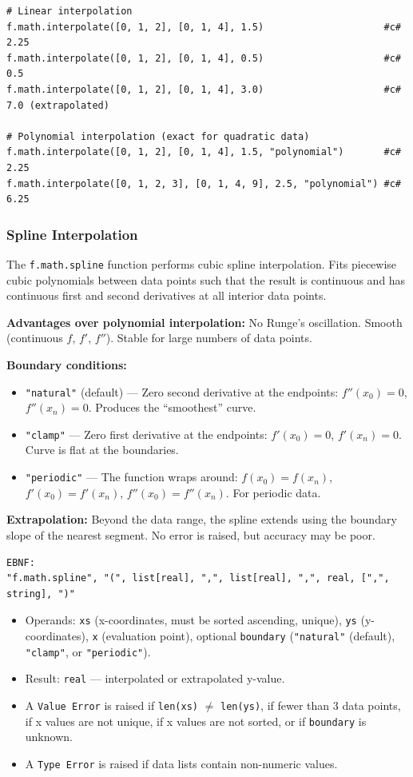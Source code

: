 \begin{verbatim}
# Linear interpolation
f.math.interpolate([0, 1, 2], [0, 1, 4], 1.5)                     #c# 2.25
f.math.interpolate([0, 1, 2], [0, 1, 4], 0.5)                     #c# 0.5
f.math.interpolate([0, 1, 2], [0, 1, 4], 3.0)                     #c# 7.0 (extrapolated)

# Polynomial interpolation (exact for quadratic data)
f.math.interpolate([0, 1, 2], [0, 1, 4], 1.5, "polynomial")       #c# 2.25
f.math.interpolate([0, 1, 2, 3], [0, 1, 4, 9], 2.5, "polynomial") #c# 6.25
\end{verbatim}

\subsubsection{Spline Interpolation}
The \texttt{f.math.spline} function performs cubic spline interpolation. Fits piecewise cubic polynomials between data points such that the result is continuous and has continuous first and second derivatives at all interior data points.

\textbf{Advantages over polynomial interpolation:} No Runge's oscillation. Smooth (continuous $f$, $f'$, $f''$). Stable for large numbers of data points.

\textbf{Boundary conditions:}
\begin{itemize}
\item \texttt{"natural"} (default) --- Zero second derivative at the endpoints: $f''(x_0) = 0$, $f''(x_n) = 0$. Produces the ``smoothest'' curve.
\item \texttt{"clamp"} --- Zero first derivative at the endpoints: $f'(x_0) = 0$, $f'(x_n) = 0$. Curve is flat at the boundaries.
\item \texttt{"periodic"} --- The function wraps around: $f(x_0) = f(x_n)$, $f'(x_0) = f'(x_n)$, $f''(x_0) = f''(x_n)$. For periodic data.
\end{itemize}

\textbf{Extrapolation:} Beyond the data range, the spline extends using the boundary slope of the nearest segment. No error is raised, but accuracy may be poor.

\begin{verbatim}
EBNF:
"f.math.spline", "(", list[real], ",", list[real], ",", real, [",", string], ")"
\end{verbatim}
\begin{itemize}
\item Operands: \texttt{xs} (x-coordinates, must be sorted ascending, unique), \texttt{ys} (y-coordinates), \texttt{x} (evaluation point), optional \texttt{boundary} (\texttt{"natural"} (default), \texttt{"clamp"}, or \texttt{"periodic"}).
\item Result: \texttt{real} --- interpolated or extrapolated y-value.
\item A \texttt{Value Error} is raised if \texttt{len(xs)} $\neq$ \texttt{len(ys)}, if fewer than 3 data points, if x values are not unique, if x values are not sorted, or if \texttt{boundary} is unknown.
\item A \texttt{Type Error} is raised if data lists contain non-numeric values.
\end{itemize}

